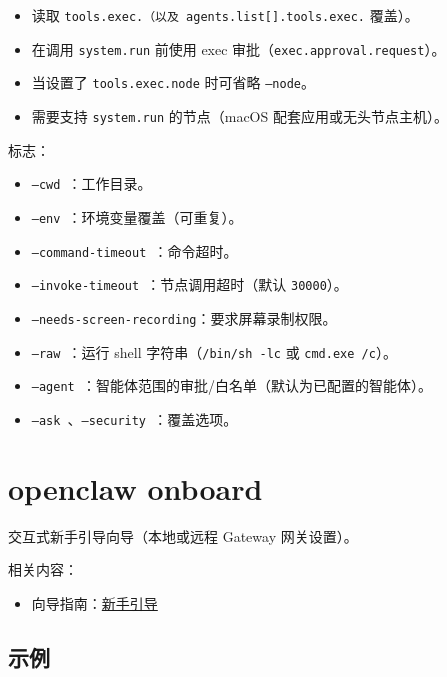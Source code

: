 \begin{itemize}
  \item 读取 \texttt{tools.exec.\textit{}（以及 \texttt{agents.list[].tools.exec.}} 覆盖）。
  \item 在调用 \texttt{system.run} 前使用 exec 审批（\texttt{exec.approval.request}）。
  \item 当设置了 \texttt{tools.exec.node} 时可省略 \texttt{--node}。
  \item 需要支持 \texttt{system.run} 的节点（macOS 配套应用或无头节点主机）。
\end{itemize}


标志：

\begin{itemize}
  \item \texttt{--cwd }：工作目录。
  \item \texttt{--env }：环境变量覆盖（可重复）。
  \item \texttt{--command-timeout }：命令超时。
  \item \texttt{--invoke-timeout }：节点调用超时（默认 \texttt{30000}）。
  \item \texttt{--needs-screen-recording}：要求屏幕录制权限。
  \item \texttt{--raw }：运行 shell 字符串（\texttt{/bin/sh -lc} 或 \texttt{cmd.exe /c}）。
  \item \texttt{--agent }：智能体范围的审批/白名单（默认为已配置的智能体）。
  \item \texttt{--ask }、\texttt{--security }：覆盖选项。
\end{itemize}



\clearpage

\section{openclaw onboard}


交互式新手引导向导（本地或远程 Gateway 网关设置）。

相关内容：

\begin{itemize}
  \item 向导指南：\href{/start/onboarding}{新手引导}
\end{itemize}


\subsection{示例}


